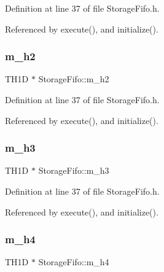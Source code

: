Definition at line 37 of file Storage\+Fifo.\+h.



Referenced by execute(), and initialize().

\mbox{\label{classStorageFifo_a3caf6211541aaa4be8e60c03d79bf253}} 
\subsubsection{\texorpdfstring{m\+\_\+h2}{m\_h2}}
{\footnotesize\ttfamily T\+H1D $\ast$ Storage\+Fifo\+::m\+\_\+h2\hspace{0.3cm}{\ttfamily [private]}}



Definition at line 37 of file Storage\+Fifo.\+h.



Referenced by execute(), and initialize().

\mbox{\label{classStorageFifo_a7e6b54c96a9b53a9917f7f21bda12b2e}} 
\subsubsection{\texorpdfstring{m\+\_\+h3}{m\_h3}}
{\footnotesize\ttfamily T\+H1D $\ast$ Storage\+Fifo\+::m\+\_\+h3\hspace{0.3cm}{\ttfamily [private]}}



Definition at line 37 of file Storage\+Fifo.\+h.



Referenced by execute(), and initialize().

\mbox{\label{classStorageFifo_ad026ffc1c7590bb3563538490be9aa00}} 
\subsubsection{\texorpdfstring{m\+\_\+h4}{m\_h4}}
{\footnotesize\ttfamily T\+H1D $\ast$ Storage\+Fifo\+::m\+\_\+h4\hspace{0.3cm}{\ttfamily [private]}}



